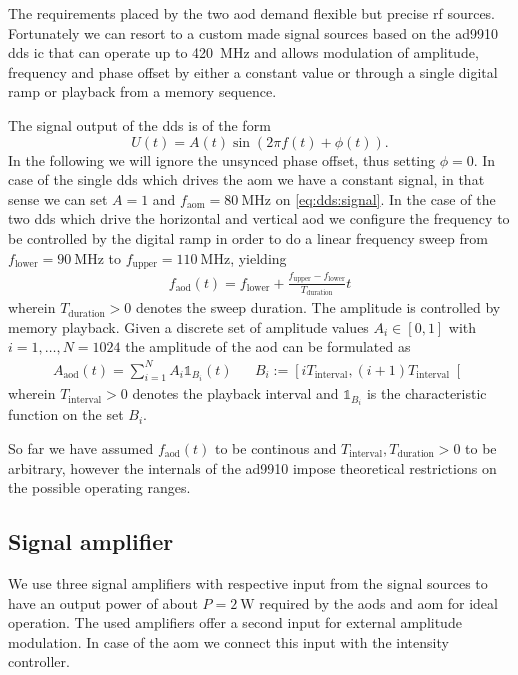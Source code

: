 The requirements placed by the two \gls{aod} demand flexible but precise
\gls{rf} sources. Fortunately we can resort to a custom made signal
sources based on the \gls{ad9910} \gls{dds} \cite{AD9910} \gls{ic} that can
operate up to \SI{420}{\mega\hertz} and allows modulation of amplitude,
frequency and phase offset by either a constant value or through a single
digital ramp or playback from a memory sequence.

The signal output of the \gls{dds} is of the form
\begin{equation}
  U(t)=A(t)\sin(2\pi f(t)+\phi(t)).
  \label{eq:dds:signal}
\end{equation}
In the following we will ignore the unsynced phase offset, thus setting
$\phi=0$. In case of the single \gls{dds} which drives the \gls{aom} we
have a constant signal, in that sense we can set $A=1$ and
$f_\text{aom}=\SI{80}{\mega\hertz}$ on \cref{eq:dds:signal}.
In the case of the two \gls{dds} which drive the horizontal and vertical
\gls{aod} we configure the frequency to be controlled by the digital ramp in
order to do a linear frequency sweep from
$f_\text{lower}=\SI{90}{\mega\hertz}$ to
$f_\text{upper}=\SI{110}{\mega\hertz}$, yielding
\begin{align}
  f_\text{aod}(t)
  =
  f_\text{lower} + \frac{f_\text{upper}-f_\text{lower}}{T_\text{duration}}t
\end{align}
wherein $T_\text{duration}>0$ denotes the sweep duration. The amplitude is
controlled by memory playback. Given a discrete set of amplitude values
$A_i\in[0,1]$ with $i=1,\dots,N=1024$ the amplitude of the \gls{aod} can be
formulated as
\begin{align}
  A_\text{aod}(t)
  =\sum^N_{i=1}A_i\mathbb{1}_{B_i}(t)
  &&
  B_i:=\left[iT_\text{interval}, (i+1)T_\text{interval}\right[
\end{align}
wherein $T_\text{interval}>0$ denotes the playback interval and
$\mathbb{1}_{B_i}$ is the characteristic function on the set $B_i$.

So far we have assumed $f_\text{aod}(t)$ to be continous and
$T_\text{interval},T_\text{duration}>0$ to be arbitrary, however the internals
of the \gls{ad9910} impose theoretical restrictions on the possible operating
ranges.

\subsection{Signal amplifier}

We use three signal amplifiers with respective input from the signal sources
to have an output power of about $P=\SI{2}{\watt}$ required by the \gls{aod}s
and \gls{aom} for ideal operation. The used amplifiers offer a second input
for external amplitude modulation. In case of the \gls{aom} we connect this
input with the intensity controller.

